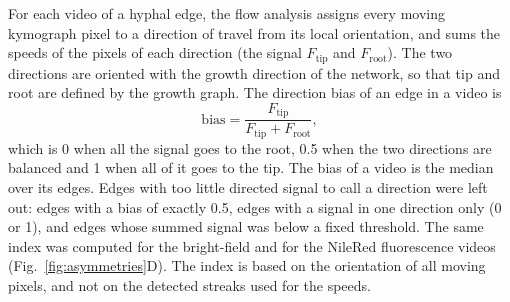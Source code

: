
For each video of a hyphal edge, the flow analysis assigns every moving kymograph pixel to a direction of travel from its local orientation, and sums the speeds of the pixels of each direction (the signal $F_{\mathrm{tip}}$ and $F_{\mathrm{root}}$).
The two directions are oriented with the growth direction of the network, so that tip and root are defined by the growth graph.
The direction bias of an edge in a video is
\[
  \mathrm{bias} = \frac{F_{\mathrm{tip}}}{F_{\mathrm{tip}} + F_{\mathrm{root}}},
\]
which is 0 when all the signal goes to the root, 0.5 when the two directions are balanced and 1 when all of it goes to the tip.
The bias of a video is the median over its edges.
Edges with too little directed signal to call a direction were left out: edges with a bias of exactly 0.5, edges with a signal in one direction only (0 or 1), and edges whose summed signal was below a fixed threshold.
The same index was computed for the bright-field and for the NileRed fluorescence videos (Fig.~\ref{fig:asymmetries}D).
The index is based on the orientation of all moving pixels, and not on the detected streaks used for the speeds.


